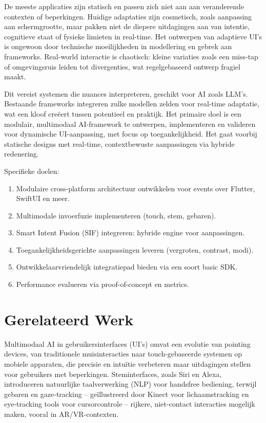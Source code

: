 \documentclass[openany]{book}
\begin{document}
De meeste applicaties zijn statisch en passen zich niet aan aan veranderende contexten of beperkingen. Huidige adaptaties zijn cosmetisch, zoals aanpassing aan schermgrootte, maar pakken niet de diepere uitdagingen aan van intentie, cognitieve staat of fysieke limieten in real-time.
Het ontwerpen van adaptieve UI's is ongewoon door technische moeilijkheden in modellering en gebrek aan frameworks. Real-world interactie is chaotisch: kleine variaties zoals een miss-tap of omgevingsruis leiden tot divergenties, wat regelgebaseerd ontwerp fragiel maakt.

Dit vereist systemen die nuances interpreteren, geschikt voor AI zoals LLM's. Bestaande frameworks integreren zulke modellen zelden voor real-time adaptatie, wat een kloof creëert tussen potentieel en praktijk.
Het primaire doel is een modulair, multimodaal AI-framework te ontwerpen, implementeren en valideren voor dynamische UI-aanpassing, met focus op toegankelijkheid. Het gaat voorbij statische designs met real-time, contextbewuste aanpassingen via hybride redenering.

Specifieke doelen:
\begin{enumerate}
    \item Modulaire cross-platform architectuur ontwikkelen voor events over Flutter, SwiftUI en meer.
    \item Multimodale invoerfuzie implementeren (touch, stem, gebaren).
    \item Smart Intent Fusion (SIF) integreren: hybride engine voor aanpassingen.
    \item Toegankelijkheidsgerichte aanpassingen leveren (vergroten, contrast, modi).
    \item Ontwikkelaarvriendelijk integratiepad bieden via een soort basic SDK.
    \item Performance evalueren via proof-of-concept en metrics.
\end{enumerate}

\section*{Gerelateerd Werk}
Multimodaal AI in gebruikersinterfaces (UI's) omvat een evolutie van pointing devices, van traditionele muisinteracties naar touch-gebaseerde systemen op mobiele apparaten, die precisie en intuïtie verbeteren maar uitdagingen stellen voor gebruikers met beperkingen. Steminterfaces, zoals Siri en Alexa, introduceren natuurlijke taalverwerking (NLP) voor handsfree bediening, terwijl gebaren en gaze-tracking – geïllustreerd door Kinect voor lichaamstracking en eye-tracking tools voor cursorcontrole – rijkere, niet-contact interacties mogelijk maken, vooral in AR/VR-contexten.
\end{document}
